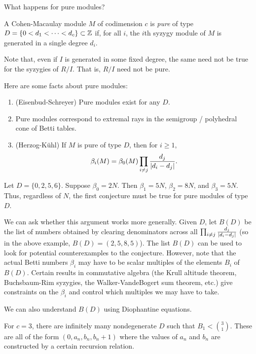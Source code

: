 \documentclass{amsart}
\begin{document}
What happens for pure modules?

\begin{dfn}
	A Cohen-Macaulay module $M$ of codimension $c$ is \emph{pure} of type $D = \{ 0 < d_1 < \dots < d_c \} \subset \mathbb{Z}$ if, for all $i$, the $i$th syzygy module of $M$ is generated in a single degree $d_i$.
\end{dfn}

Note that, even if $I$ is generated in some fixed degree, the same need not be true for the syzygies of $R / I$.
That is, $R / I$ need not be pure.

Here are some facts about pure modules:
\begin{enumerate}
	\item (Eisenbud-Schreyer) Pure modules exist for any $D$.
	\item Pure modules correspond to extremal rays in the semigroup / polyhedral cone of Betti tables.
	\item (Herzog-K\"uhl) If $M$ is pure of type $D$, then for $i \geq 1$, 
		\[
			\beta_i(M) = \beta_0(M) \prod_{i \neq j} \frac{d_j}{\left|{d_i - d_j}\right|}.
		\]
\end{enumerate}

\begin{ex}
	Let $D = \{0, 2, 5, 6\}$.
	Suppose $\beta_0 = 2N$.
	Then $\beta_1 = 5N$, $\beta_2 = 8N$, and $\beta_3 = 5N$.
	Thus, regardless of $N$, the first conjecture must be true for pure modules of type $D$.
\end{ex}

We can ask whether this argument works more generally.
Given $D$, let $B(D)$ be the list of numbers obtained by clearing denominators across all $\prod_{i \neq j} \frac{d_j}{\left|{d_i - d_j}\right|}$ (so in the above example, $B(D) = (2, 5, 8, 5)$).
The list $B(D)$ can be used to look for potential counterexamples to the conjecture.
However, note that the actual Betti numbers $\beta_i$ may have to be scalar multiples of the elements $B_i$ of $B(D)$.
Certain results in commutative algebra (the Krull altitude theorem, Buchsbaum-Rim syzygies, the Walker-VandeBogert sum theorem, etc.) give constraints on the $\beta_i$ and control which multiples we may have to take.

We can also understand $B(D)$ using Diophantine equations.

\begin{thm}
	For $c=3$, there are infinitely many nondegenerate $D$ such that $B_1 < \binom{3}{1}$.
	These are all of the form $(0, a_n, b_n, b_n+1)$ where the values of $a_n$ and $b_n$ are constructed by a certain recursion relation.
\end{thm}
\end{document}
